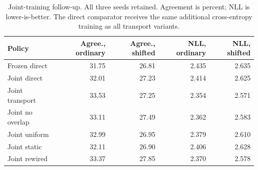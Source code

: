 \begin{table}[t]
\centering\small
\caption{Joint-training follow-up. All three seeds retained. Agreement is percent; NLL is lower-is-better. The direct comparator receives the same additional cross-entropy training as all transport variants.}
\begin{tabular}{lrrrr}
\toprule
Policy & Agree., ordinary & Agree., shifted & NLL, ordinary & NLL, shifted \\
\midrule
Frozen direct & 31.75 & 26.81 & 2.435 & 2.635 \\
Joint direct & 32.01 & 27.23 & 2.414 & 2.625 \\
Joint transport & 33.53 & 27.25 & 2.354 & 2.571 \\
Joint no overlap & 33.11 & 27.49 & 2.362 & 2.583 \\
Joint uniform & 32.99 & 26.95 & 2.379 & 2.610 \\
Joint static & 32.11 & 26.90 & 2.406 & 2.628 \\
Joint rewired & 33.37 & 27.85 & 2.370 & 2.578 \\
\bottomrule
\end{tabular}
\end{table}

